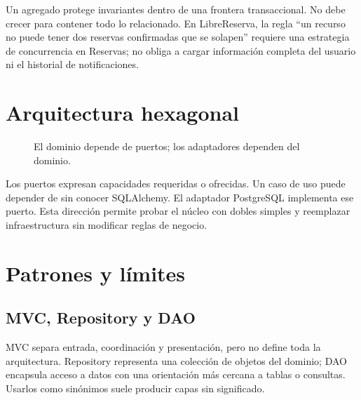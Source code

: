 Un agregado protege invariantes dentro de una frontera transaccional. No debe crecer para contener todo lo relacionado. En LibreReserva, la regla ``un recurso no puede tener dos reservas confirmadas que se solapen'' requiere una estrategia de concurrencia en Reservas; no obliga a cargar información completa del usuario ni el historial de notificaciones.

\section{Arquitectura hexagonal}

\begin{figure}[H]
\centering
{}
\caption{El dominio depende de puertos; los adaptadores dependen del dominio.}
\label{fig:hexagonal}
\end{figure}

Los puertos expresan capacidades requeridas o ofrecidas. Un caso de uso puede depender de  sin conocer SQLAlchemy. El adaptador PostgreSQL implementa ese puerto. Esta dirección permite probar el núcleo con dobles simples y reemplazar infraestructura sin modificar reglas de negocio.

\section{Patrones y límites}
\subsection{MVC, Repository y DAO}
MVC separa entrada, coordinación y presentación, pero no define toda la arquitectura. Repository representa una colección de objetos del dominio; DAO encapsula acceso a datos con una orientación más cercana a tablas o consultas. Usarlos como sinónimos suele producir capas sin significado.

